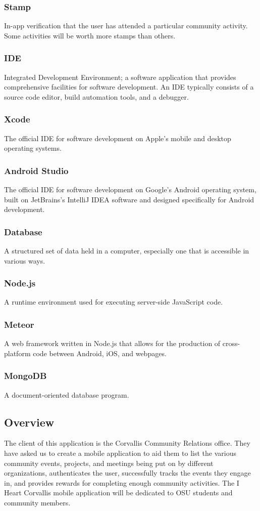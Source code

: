 \documentclass[draftclsnofoot, onecolumn, 10pt, compsoc]{IEEEtran}
\begin{document}
			\subsubsection{Stamp} In-app verification that the user has attended a particular community activity. Some activities will be worth more stamps than others.
			\subsubsection{IDE} Integrated Development Environment; a software application that provides comprehensive facilities for software development. An IDE typically consists of a source code editor, build automation tools, and a debugger.
			\subsubsection{Xcode} The official IDE for software development on Apple's mobile and desktop operating systems.
			\subsubsection{Android Studio} The official IDE for software development on Google's Android operating system, built on JetBrains's IntelliJ IDEA software and designed specifically for Android development.
			\subsubsection{Database} A structured set of data held in a computer, especially one that is accessible in various ways.
			\subsubsection{Node.js} A runtime environment used for executing server-side JavaScript code.
			\subsubsection{Meteor} A web framework written in Node.js that allows for the production of cross-platform code between Android, iOS, and webpages.
			\subsubsection{MongoDB} A document-oriented database program.

		\subsection{Overview}
			The client of this application is the Corvallis Community Relations office. They have asked us to create a mobile application to aid them to list the various community events, projects, and meetings being put on by different organizations, authenticates the user, successfully tracks the events they engage in, and provides rewards for completing enough community activities. The I Heart Corvallis mobile application will be dedicated to OSU students and community members.
\end{document}

